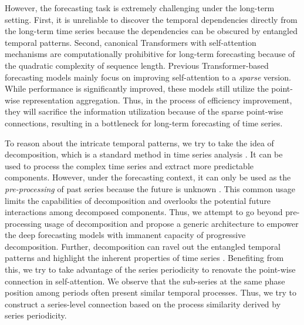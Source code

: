 However, the forecasting task is extremely challenging under the long-term setting. First, it is unreliable to discover the temporal dependencies directly from the long-term time series because the dependencies can be obscured by entangled temporal patterns. Second, canonical Transformers with self-attention mechanisms are computationally prohibitive for long-term forecasting because of the quadratic complexity of sequence length. Previous Transformer-based forecasting models \cite{haoyietal-informer-2021,kitaev2020reformer,2019Enhancing} mainly focus on improving self-attention to a \emph{sparse} version. While performance is significantly improved, these models still utilize the point-wise representation aggregation. Thus, in the process of efficiency improvement, they will sacrifice the information utilization because of the sparse point-wise connections, resulting in a bottleneck for long-term forecasting of time series.

To reason about the intricate temporal patterns, we try to take the idea of decomposition, which is a standard method in time series analysis \cite{Anderson1976TimeSeries2E,Cleveland1990STLAS}. It can be used to process the complex time series and extract more predictable components. However, under the forecasting context, it can only be used as the \emph{pre-processing} of past series because the future is unknown \cite{Hyndman2013ForecastingPA}. This common usage limits the capabilities of decomposition and overlooks the potential future interactions among decomposed components. Thus, we attempt to go beyond pre-processing usage of decomposition and propose a generic architecture to empower the deep forecasting models with immanent capacity of progressive decomposition.
Further, decomposition can ravel out the entangled temporal patterns and highlight the inherent properties of time series \cite{Hyndman2013ForecastingPA}. Benefiting from this, we try to take advantage of the series periodicity to renovate the point-wise connection in self-attention. We observe that the sub-series at the same phase position among periods often present similar temporal processes. Thus, we try to construct a series-level connection based on the process similarity derived by series periodicity.

